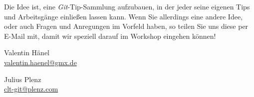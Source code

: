 \documentclass[11pt,            %
               a4paper,         %
               oneside,         %
               DIV12,           %
               fleqn,           %
               smallheadings,   %
               halfparskip,     %
               nochapterprefix, %
               bibtotocnumbered,%
              ]{scrartcl} %
\begin{document}
Die Idee ist, eine \emph{Git}-Tip-Sammlung aufzubauen, in der jeder
seine eigenen Tips und Arbeitsgänge einließen lassen kann.
Wenn Sie allerdings eine andere Idee, oder auch Fragen und Anregungen
im Vorfeld haben, so teilen Sie uns diese per E-Mail mit, damit wir
speziell darauf im Workshop eingehen können!

\hfill
\begin{minipage}{5cm}
\begin{center}
Valentin Hänel\\
\url{valentin.haenel@gmx.de}
\end{center}
\end{minipage}
\hfill
\begin{minipage}{5cm}
\begin{center}
Julius Plenz\\
\url{clt-git@plenz.com}
\end{center}
\end{minipage}
\hfill\\







%
%
\end{document}
